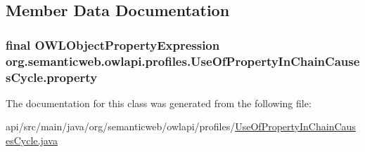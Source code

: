 \subsection{Member Data Documentation}
\hypertarget{classorg_1_1semanticweb_1_1owlapi_1_1profiles_1_1_use_of_property_in_chain_causes_cycle_af3010fe7d65aa08e19735875034a4131}{
\subsubsection[{property}]{\setlength{\rightskip}{0pt plus 5cm}final {\bf O\-W\-L\-Object\-Property\-Expression} org.\-semanticweb.\-owlapi.\-profiles.\-Use\-Of\-Property\-In\-Chain\-Causes\-Cycle.\-property\hspace{0.3cm}{\ttfamily [private]}}}\label{classorg_1_1semanticweb_1_1owlapi_1_1profiles_1_1_use_of_property_in_chain_causes_cycle_af3010fe7d65aa08e19735875034a4131}


The documentation for this class was generated from the following file\-:\begin{DoxyCompactItemize}
\item 
api/src/main/java/org/semanticweb/owlapi/profiles/\hyperlink{_use_of_property_in_chain_causes_cycle_8java}{Use\-Of\-Property\-In\-Chain\-Causes\-Cycle.\-java}\end{DoxyCompactItemize}
